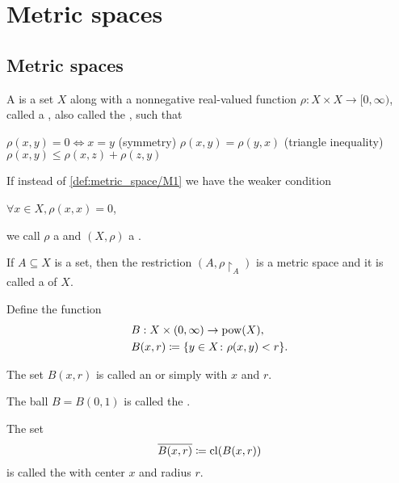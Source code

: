 \section{Metric spaces}\label{sec:metric_spaces}
\subsection{Metric spaces}\label{subsec:metric_spaces}

\begin{Definition}\label{def:metric_space}\cite[248]{Engelking1989}
  A  is a set \( X \) along with a nonnegative real-valued function \( \rho: X \times X \to [0, \infty) \), called a , also called the , such that
  \begin{DefEnum}[series=def:metric_space]
     \( \rho(x, y) = 0 \iff x = y \)
    (symmetry) \( \rho(x, y) = \rho(y, x) \)
    (triangle inequality) \( \rho(x, y) \leq \rho(x, z) + \rho(z, y) \)
  \end{DefEnum}

  If instead of \ref{def:metric_space/M1} we have the weaker condition
  \begin{DefEnum}[resume=def:metric_space]
     \( \forall x \in X, \rho(x, x) = 0 \),
  \end{DefEnum}
  we call \( \rho \) a  and \( (X, \rho) \) a .

  \begin{DefEnum}
     If \( A \subseteq X \) is a set, then the restriction \( (A, \rho{\restriction_A}) \) is a metric space and it is called a  of $X$.

     Define the function
    \begin{align*}
      &B: X \times (0, \infty) \to \operatorname{pow}(X), \\
      &B(x, r) \coloneqq \{ y \in X \colon \rho(x, y) < r \}.
    \end{align*}

    The set \( B(x, r) \) is called an  or simply  with  \( x \) and  \( r \).

    The ball \( B = B(0, 1) \) is called the .

     The set
    \begin{equation*}
      \overline{B(x, r)} \coloneqq \operatorname{cl}(B(x, r))
    \end{equation*}
    is called the  with center \( x \) and radius \( r \).


\end{DefEnum}
\end{Definition}
